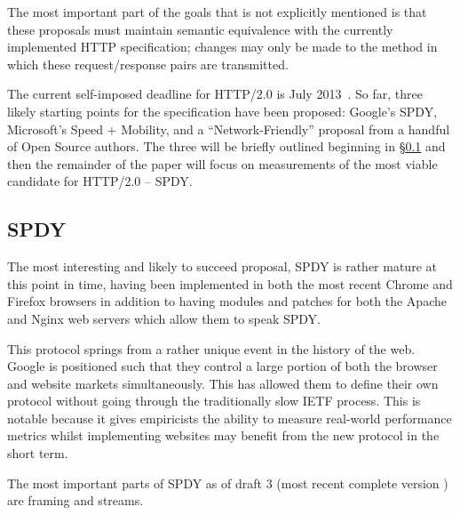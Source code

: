 \documentclass[10pt,letterpaper,notitlepage]{article}
\begin{document}
The most important part of the goals that is not explicitly mentioned is that
these proposals must maintain semantic equivalence with the currently
implemented HTTP specification; changes may only be made to the method in
which these request/response pairs are transmitted.

The current self-imposed deadline for HTTP/2.0 is July
2013~\cite{httpbis-charter}.  So far, three likely starting points for
the specification have been proposed: Google's SPDY, Microsoft's Speed +
Mobility, and a ``Network-Friendly'' proposal from a handful of Open Source
authors. The three will be briefly outlined beginning in
\S\ref{sec:background/spdy} and then the remainder of the paper will focus on
measurements of the most viable candidate for HTTP/2.0 -- SPDY.

\subsection{SPDY}
\label{sec:background/spdy}
The most interesting and likely to succeed proposal, SPDY is rather mature
at this point in time, having been implemented in both the most recent Chrome
and Firefox browsers in addition to having modules and patches for both the
Apache and Nginx web servers which allow them to speak SPDY.

This protocol springs from a rather unique event in the history of the web.
Google is positioned such that they control a large portion of both the browser
and website markets simultaneously. This has allowed them to define their own
protocol without going through the traditionally slow IETF process. This is
notable because it gives empiricists the ability to measure real-world
performance metrics whilst implementing websites may benefit from the new
protocol in the short term.

The most important parts of SPDY as of draft 3 (most recent complete version
\cite{spdy3}) are framing and streams.
\end{document}
